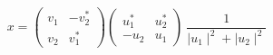\begin{equation}
x= \left(
\begin{array}{cc}
v_{1} & -v_{2}^{\ast}\\
v_{2} & v_{1}^{\ast}
\end{array}
\right)   \left(
\begin{array}{cc}
u_{1}^{\ast} & u_{2}^{\ast}\\
-u_{2} & u_{1}
\end{array}
\right)~\frac{1}{\mid u_{1}\mid^{2}+\mid u_{2}\mid^{2}}
\end{equation}

